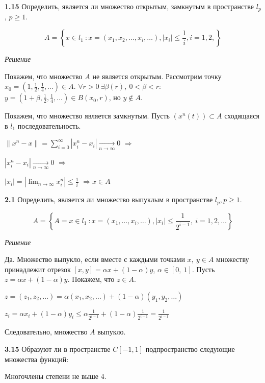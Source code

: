 \documentclass{article}
\title{}
\author{Пищулёнок Максим}
\date{29 марта 2020 г.}
\begin{document}
\maketitle

\textbf{1.15} 
Определить, является ли множество открытым, замкнутым в пространстве $l_p$, $p \ge 1$.

\[ A = \left\{ x \in l_1 \ : x = (x_1, x_2, \dots, x_i, \dots), |x_i| \le \frac{1}{i}, i = 1, 2, \right\} \]

\emph{Решение}

Покажем, что множество $A$ не является открытым. 
Рассмотрим точку $x_0 = \left(1, \frac{1}{2}, \frac{1}{4}, \dots \right) \in A$. $\forall r > 0 \ \exists \beta(r), \ 0 < \beta < r : \ $ $y = \left( 1 + \beta, \frac{1}{2}, \frac{1}{4}, \dots \right) \in B(x_0, r)$, но $y \notin A$.

Покажем, что множество является замкнутым. Пусть $(x^n(t)) \subset A$ сходящаяся в $l_1$ последовательность. 


$\| x^n - x \| = \sum_{i = 0}^\infty |x_i^n - x_i| \xrightarrow[n \to \infty]{} 0$ 
$\Rightarrow$ 

$|x_i^n - x_i| \xrightarrow[n \to \infty]{} 0$ 
$\Rightarrow$

$|x_i| = |\lim_{n \to \infty} x_i^n| \le \frac{1}{i}$
$\Rightarrow x \in A$

\textbf{2.1} 
Определить, является ли множество выпуклым в пространстве \newline $l_p, p \ge 1$.

\[A = \left\{ A = x \in l_1 \ : x = (x_1, \dots, x_i, \dots ), |x_i| \le \frac{1}{2^{i-1}}, \ i = 1, 2, \dots \right\} \]

\emph{Решение}

Да. Множество выпукло, если вместе с каждыми точками $x, \ y \in A$ множеству принадлежит отрезок $[x, y] = \alpha x + (1 - \alpha) y$, $\alpha \in [0, \ 1]$. Пусть $z = \alpha x + (1 - \alpha) y$. Покажем, что $z \in A$.

$z = (z_1, z_2, \dots) = \alpha (x_1, x_2, \dots) + (1 - \alpha ) (y_1, y_2, \dots)$

$z_i = \alpha x_i + (1 - \alpha) y_i \le \alpha \frac{1}{2^{i-1}} + (1 - \alpha) \frac{1}{2^{i-1}} = \frac{1}{2^{i-1}}$

Следовательно, множество $A$ выпукло.

\textbf{3.15}
Образуют ли в пространстве $C[-1, 1]$ подпространство следующие множества функций:

Многочлены степени не выше 4.
\end{document}
